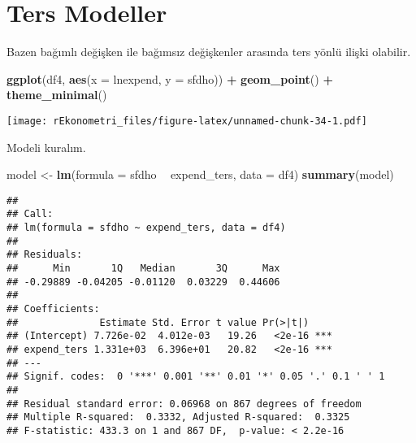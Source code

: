 \documentclass[
]{book}
\newenvironment{Shaded}{\begin{snugshade}}{\end{snugshade}}
\newcommand{\CommentTok}[1]{\textcolor[rgb]{0.56,0.35,0.01}{\textit{#1}}}
\newcommand{\DataTypeTok}[1]{\textcolor[rgb]{0.13,0.29,0.53}{#1}}
\newcommand{\DecValTok}[1]{\textcolor[rgb]{0.00,0.00,0.81}{#1}}
\newcommand{\KeywordTok}[1]{\textcolor[rgb]{0.13,0.29,0.53}{\textbf{#1}}}
\newcommand{\NormalTok}[1]{#1}
\newcommand{\OperatorTok}[1]{\textcolor[rgb]{0.81,0.36,0.00}{\textbf{#1}}}
\newcommand{\StringTok}[1]{\textcolor[rgb]{0.31,0.60,0.02}{#1}}
\begin{document}
\hypertarget{ters-modeller}{%
\section{Ters Modeller}\label{ters-modeller}}

Bazen bağımlı değişken ile bağımsız değişkenler arasında ters yönlü ilişki olabilir.

\begin{Shaded}
\begin{Highlighting}[]
\KeywordTok{ggplot}\NormalTok{(df4, }\KeywordTok{aes}\NormalTok{(}\DataTypeTok{x =}\NormalTok{ lnexpend, }\DataTypeTok{y =}\NormalTok{ sfdho)) }\OperatorTok{+}
\StringTok{  }\KeywordTok{geom_point}\NormalTok{() }\OperatorTok{+}
\StringTok{  }\KeywordTok{theme_minimal}\NormalTok{()}
\end{Highlighting}
\end{Shaded}

\texttt{[image: rEkonometri\_files/figure-latex/unnamed-chunk-34-1.pdf]}

\begin{Shaded}
\end{Shaded}

Modeli kuralım.

\begin{Shaded}
\begin{Highlighting}[]
\NormalTok{model <-}\StringTok{ }\KeywordTok{lm}\NormalTok{(}\DataTypeTok{formula =}\NormalTok{ sfdho }\OperatorTok{~}\StringTok{ }\NormalTok{expend_ters, }\DataTypeTok{data =}\NormalTok{ df4)}
\KeywordTok{summary}\NormalTok{(model)}
\end{Highlighting}
\end{Shaded}

\begin{verbatim}
## 
## Call:
## lm(formula = sfdho ~ expend_ters, data = df4)
## 
## Residuals:
##      Min       1Q   Median       3Q      Max 
## -0.29889 -0.04205 -0.01120  0.03229  0.44606 
## 
## Coefficients:
##              Estimate Std. Error t value Pr(>|t|)    
## (Intercept) 7.726e-02  4.012e-03   19.26   <2e-16 ***
## expend_ters 1.331e+03  6.396e+01   20.82   <2e-16 ***
## ---
## Signif. codes:  0 '***' 0.001 '**' 0.01 '*' 0.05 '.' 0.1 ' ' 1
## 
## Residual standard error: 0.06968 on 867 degrees of freedom
## Multiple R-squared:  0.3332, Adjusted R-squared:  0.3325 
## F-statistic: 433.3 on 1 and 867 DF,  p-value: < 2.2e-16
\end{verbatim}
\end{document}
